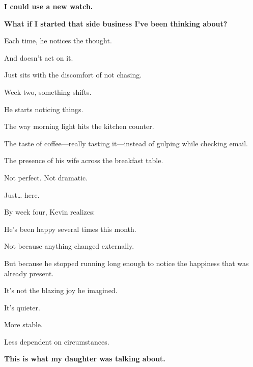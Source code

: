 \documentclass[11pt,twoside]{book}
\begin{document}
\textbf{I could use a new watch.}

\textbf{What if I started that side business I've been thinking about?}

Each time, he notices the thought.

And doesn't act on it.

Just sits with the discomfort of not chasing.

Week two, something shifts.

He starts noticing things.

The way morning light hits the kitchen counter.

The taste of coffee—really tasting it—instead of gulping while checking email.

The presence of his wife across the breakfast table.

Not perfect. Not dramatic.

Just\ldots{} here.

By week four, Kevin realizes:

He's been happy several times this month.

Not because anything changed externally.

But because he stopped running long enough to notice the happiness that was already present.

It's not the blazing joy he imagined.

It's quieter.

More stable.

Less dependent on circumstances.

\textbf{This is what my daughter was talking about.}
\end{document}
